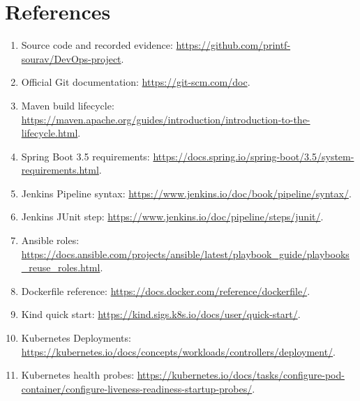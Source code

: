\documentclass[12pt,a4paper]{article}
\begin{document}
\section*{References}
\begin{enumerate}[nosep]
\item Source code and recorded evidence: \url{https://github.com/printf-sourav/DevOps-project}.
\item Official Git documentation: \url{https://git-scm.com/doc}.
\item Maven build lifecycle: \url{https://maven.apache.org/guides/introduction/introduction-to-the-lifecycle.html}.
\item Spring Boot 3.5 requirements: \url{https://docs.spring.io/spring-boot/3.5/system-requirements.html}.
\item Jenkins Pipeline syntax: \url{https://www.jenkins.io/doc/book/pipeline/syntax/}.
\item Jenkins JUnit step: \url{https://www.jenkins.io/doc/pipeline/steps/junit/}.
\item Ansible roles: \url{https://docs.ansible.com/projects/ansible/latest/playbook_guide/playbooks_reuse_roles.html}.
\item Dockerfile reference: \url{https://docs.docker.com/reference/dockerfile/}.
\item Kind quick start: \url{https://kind.sigs.k8s.io/docs/user/quick-start/}.
\item Kubernetes Deployments: \url{https://kubernetes.io/docs/concepts/workloads/controllers/deployment/}.
\item Kubernetes health probes: \url{https://kubernetes.io/docs/tasks/configure-pod-container/configure-liveness-readiness-startup-probes/}.
\end{enumerate}
\end{document}
